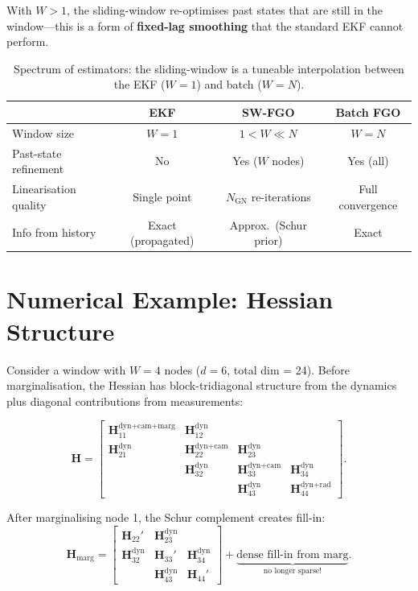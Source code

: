 \documentclass[11pt,a4paper]{article}
\newcommand{\bH}{\bm{H}}
\theoremstyle{definition}
\theoremstyle{plain}
\begin{document}
With $W > 1$, the sliding-window re-optimises past states that are still
in the window—this is a form of \textbf{fixed-lag smoothing} that
the standard EKF cannot perform.

\begin{table}[h!]
\centering
\begin{tabular}{lccc}
\toprule
& \textbf{EKF} & \textbf{SW-FGO} & \textbf{Batch FGO} \\
\midrule
Window size         & $W = 1$   & $1 < W \ll N$  & $W = N$ \\
Past-state refinement & No       & Yes ($W$ nodes) & Yes (all) \\
Linearisation quality & Single point & $N_{\text{GN}}$ re-iterations & Full convergence \\
Info from history   & Exact (propagated) & Approx.\ (Schur prior) & Exact \\
\bottomrule
\end{tabular}
\caption{Spectrum of estimators: the sliding-window is a tuneable
         interpolation between the EKF ($W=1$) and batch ($W=N$).}
\end{table}

\section{Numerical Example: Hessian Structure}
\label{sec:example}

Consider a window with $W = 4$ nodes ($d = 6$, total dim = 24).
Before marginalisation, the Hessian has block-tridiagonal structure from the
dynamics plus diagonal contributions from measurements:

\begin{equation}
  \bH = \begin{bmatrix}
    \bH_{11}^{\text{dyn+cam+marg}} & \bH_{12}^{\text{dyn}} & & \\
    \bH_{21}^{\text{dyn}} & \bH_{22}^{\text{dyn+cam}} & \bH_{23}^{\text{dyn}} & \\
    & \bH_{32}^{\text{dyn}} & \bH_{33}^{\text{dyn+cam}} & \bH_{34}^{\text{dyn}} \\
    & & \bH_{43}^{\text{dyn}} & \bH_{44}^{\text{dyn+rad}}
  \end{bmatrix}.
\end{equation}

After marginalising node 1, the Schur complement creates fill-in:
\begin{equation}
  \bH_{\text{marg}} = \begin{bmatrix}
    \bH_{22}' & \bH_{23}^{\text{dyn}} & \\
    \bH_{32}^{\text{dyn}} & \bH_{33}' & \bH_{34}^{\text{dyn}} \\
    & \bH_{43}^{\text{dyn}} & \bH_{44}'
  \end{bmatrix}
  + \underbrace{\text{dense fill-in from marg}}_{\text{no longer sparse!}}.
\end{equation}
\end{document}

